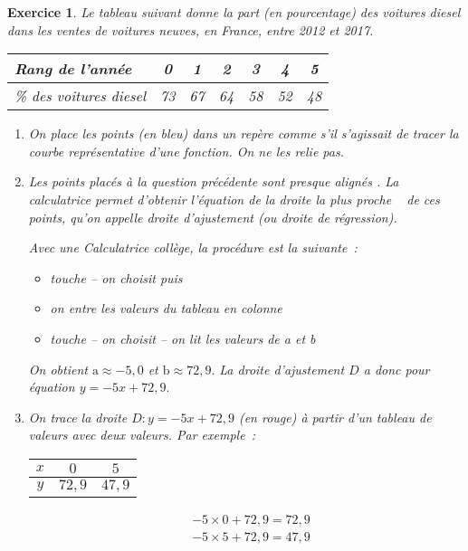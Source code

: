 \documentclass[10pt]{article}
\newtheorem{exo}{Exercice}
\begin{document}
\begin{exo}

Le tableau suivant donne la part (en pourcentage) des voitures diesel dans les ventes
de voitures neuves, en France, entre 2012 et 2017.

\begin{center}
\begin{tabular}{|m{3cm}|*{6}{c|}}\hline
Rang de l'année 	&0 		&1 		&2 		&3 		&4 		&5\\ \hline
\% des voitures 
diesel	&73 	&67 	&64 	&58 	&52 	&48\\ \hline
\end{tabular}
\end{center}




\begin{enumerate}
\item On place les points (en bleu) dans un repère comme s'il s'agissait de tracer la courbe représentative d'une fonction. On ne les relie pas.
\item Les points placés à la question précédente sont \og presque alignés \fg. La calculatrice permet d'obtenir l'équation de la droite \og la plus proche \fg~{} de ces points, qu'on appelle droite d'ajustement (ou droite de régression).

\medskip

Avec une Calculatrice collège, la procédure est la suivante~:

\begin{itemize}
\item[\textbullet] touche  -- on choisit  puis  
\item[\textbullet] on entre les valeurs du tableau en colonne
\item[\textbullet] touche  -- on choisit  -- on lit les valeurs de a et b
\end{itemize}

On obtient $\text{a}\approx -5,0$ et $\text{b}\approx 72,9.$ La droite d'ajustement $D$ a donc pour équation $y=-5x+72,9.$


\item On trace la droite $D:y=-5x+72,9$ (en rouge) à partir d'un tableau de valeurs avec deux valeurs. Par exemple~:

\setlength{\columnseprule}{1pt}

\begin{multicols}{2}
\begin{center}
\begin{tabular}{|c|c|c|}\hline
$x$&$0$&$5$\\ \hline
$y$&$72,9$&$47,9$\\ \hline
\end{tabular}
\end{center}
\columnbreak
\begin{align*}
&-5\times 0+72,9=72,9\\
&-5\times 5+72,9=47,9\end{align*}
\end{multicols}



\end{enumerate}
\end{exo}
\end{document}
